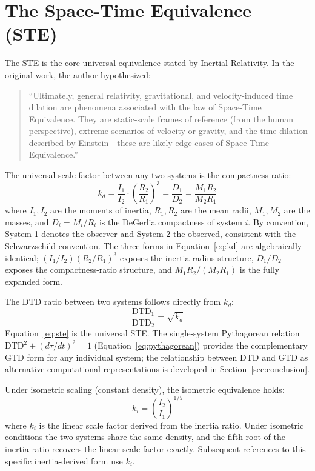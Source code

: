 \documentclass[twoside,twocolumn,9pt]{article}
\begin{document}
\section{The Space-Time Equivalence (STE)}
The STE is the core universal equivalence stated by Inertial Relativity. In the original work\citep{degerlia202501}, the author hypothesized:
\begin{quote}
``Ultimately, general relativity, gravitational, and velocity-induced time dilation are phenomena associated with the law of Space-Time Equivalence. They are static-scale frames of reference (from the human perspective), extreme scenarios of velocity or gravity, and the time dilation described by Einstein---these are likely edge cases of Space-Time Equivalence.''
\end{quote}
The universal scale factor between any two systems is the compactness ratio:
\begin{equation} \label{eq:kd}
k_d = \frac{I_1}{I_2} \cdot \left(\frac{R_2}{R_1}\right)^3 = \frac{D_1}{D_2} = \frac{M_1 R_2}{M_2 R_1}
\end{equation}
where $I_1, I_2$ are the moments of inertia, $R_1, R_2$ are the mean radii, $M_1, M_2$ are the masses, and $D_i = M_i/R_i$ is the DeGerlia compactness of system $i$. By convention, System 1 denotes the observer and System 2 the observed, consistent with the Schwarzschild convention. The three forms in Equation~\ref{eq:kd} are algebraically identical; $(I_1/I_2)(R_2/R_1)^3$ exposes the inertia-radius structure, $D_1/D_2$ exposes the compactness-ratio structure, and $M_1 R_2/(M_2 R_1)$ is the fully expanded form.

The DTD ratio between two systems follows directly from $k_d$:
\begin{equation} \label{eq:ste}
\frac{\text{DTD}_1}{\text{DTD}_2} = \sqrt{k_d}
\end{equation}
Equation~\ref{eq:ste} is the universal STE. The single-system Pythagorean relation $\text{DTD}^2 + (d\tau/dt)^2 = 1$ (Equation~\ref{eq:pythagorean}) provides the complementary GTD form for any individual system; the relationship between DTD and GTD as alternative computational representations is developed in Section~\ref{sec:conclusion}.

Under isometric scaling (constant density), the isometric equivalence holds:
\begin{equation} \label{eq:isometric}
k_i = \left(\frac{I_2}{I_1}\right)^{1/5}
\end{equation}
where $k_i$ is the linear scale factor derived from the inertia ratio. Under isometric conditions the two systems share the same density, and the fifth root of the inertia ratio recovers the linear scale factor exactly. Subsequent references to this specific inertia-derived form use $k_i$.
\end{document}
